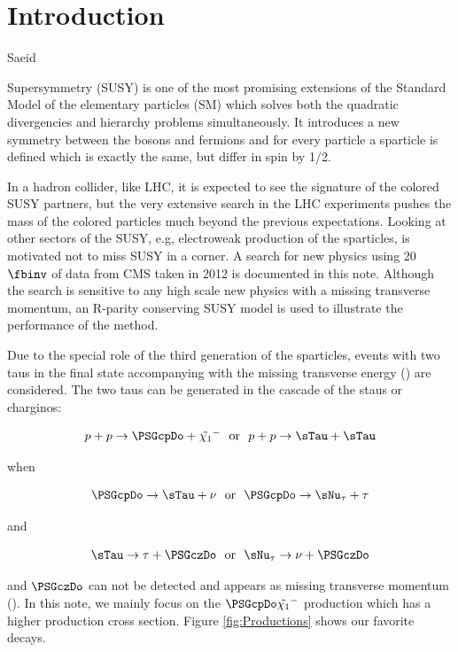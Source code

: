 \section{Introduction}
\label{sect:introduction}

Saeid

Supersymmetry \cite{Martin:1997ns} (SUSY) is one of the most promising extensions of the 
Standard Model of the elementary particles (SM) which solves both the 
quadratic divergencies and hierarchy problems simultaneously. It introduces a new symmetry between the bosons and fermions and 
for every particle a sparticle is defined which is exactly the same, but differ in spin by 1/2. 

In a hadron collider, like LHC, it is expected to see the signature of the colored SUSY partners, 
but the very extensive search in the LHC experiments pushes the mass of the colored particles much 
beyond the previous expectations. 
Looking at other sectors of the SUSY, e.g, electroweak production of the sparticles, is motivated not to miss SUSY in a corner.
A search for new physics using 20 $\fbinv$ of data from CMS taken in 2012 is documented in this note. 
Although the search is sensitive to any high scale 
new physics with a missing transverse momentum, an R-parity conserving SUSY model is used 
to illustrate the performance of the method.

Due to the special role of the third generation of the sparticles, events with two taus in the final state 
accompanying with the missing transverse energy (\MET) are considered.
The two taus can be generated in the cascade of the staus or charginos:
\begin{linenomath}
\begin{equation}
p + p \rightarrow \PSGcpDo +\PSGcmDo ~~\mathrm{or}~~  p + p \rightarrow \sTau + \sTau
\end{equation}
\end{linenomath}
when 
\begin{linenomath}
\begin{equation}
\PSGcpDo \rightarrow \sTau + \nu ~~\mathrm{or}~~  \PSGcpDo \rightarrow \sNu_{\tau} + \tau 
\end{equation}
\end{linenomath}
and 
\begin{linenomath}
\begin{equation}
\sTau \rightarrow \tau + \PSGczDo ~~\mathrm{or}~~  \sNu_{\tau} \rightarrow \nu + \PSGczDo 
\end{equation}
\end{linenomath}
and $\PSGczDo$ can not be detected and appears as missing transverse momentum (\MET).
In this note, we mainly focus on the $\PSGcpDo\PSGcmDo$ production which has a higher 
production cross section. Figure \ref{fig:Productions} shows our favorite decays.


